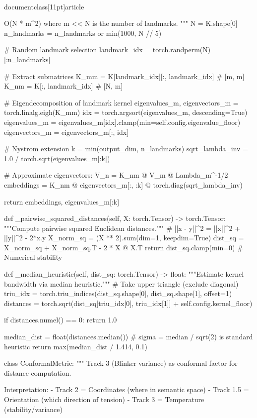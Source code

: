\\documentclass[11pt]{article}
\begin{document}
\begin{CodeBlock}
        O(N * m^2) where m << N is the number of landmarks.
        """
        N = K.shape[0]
        n_landmarks = n_landmarks or min(1000, N // 5)

        # Random landmark selection
        landmark_idx = torch.randperm(N)[:n_landmarks]

        # Extract submatrices
        K_mm = K[landmark_idx][:, landmark_idx]  # [m, m]
        K_nm = K[:, landmark_idx]                 # [N, m]

        # Eigendecomposition of landmark kernel
        eigenvalues_m, eigenvectors_m = torch.linalg.eigh(K_mm)
        idx = torch.argsort(eigenvalues_m, descending=True)
        eigenvalues_m = eigenvalues_m[idx].clamp(min=self.config.eigenvalue_floor)
        eigenvectors_m = eigenvectors_m[:, idx]

        # Nystrom extension
        k = min(output_dim, n_landmarks)
        sqrt_lambda_inv = 1.0 / torch.sqrt(eigenvalues_m[:k])

        # Approximate eigenvectors: V_n = K_nm @ V_m @ Lambda_m^{-1/2}
        embeddings = K_nm @ eigenvectors_m[:, :k] @ torch.diag(sqrt_lambda_inv)

        return embeddings, eigenvalues_m[:k]

    def _pairwise_squared_distances(self, X: torch.Tensor) -> torch.Tensor:
        """Compute pairwise squared Euclidean distances."""
        # ||x - y||^2 = ||x||^2 + ||y||^2 - 2*x.y
        X_norm_sq = (X ** 2).sum(dim=1, keepdim=True)
        dist_sq = X_norm_sq + X_norm_sq.T - 2 * X @ X.T
        return dist_sq.clamp(min=0)  # Numerical stability

    def _median_heuristic(self, dist_sq: torch.Tensor) -> float:
        """Estimate kernel bandwidth via median heuristic."""
        # Take upper triangle (exclude diagonal)
        triu_idx = torch.triu_indices(dist_sq.shape[0], dist_sq.shape[1], offset=1)
        distances = torch.sqrt(dist_sq[triu_idx[0], triu_idx[1]] + self.config.kernel_floor)

        if distances.numel() == 0:
            return 1.0

        median_dist = float(distances.median())
        # sigma = median / sqrt(2) is standard heuristic
        return max(median_dist / 1.414, 0.1)


class ConformalMetric:
    """
    Track 3 (Blinker variance) as conformal factor for distance computation.

    Interpretation:
        - Track 2 = Coordinates (where in semantic space)
        - Track 1.5 = Orientation (which direction of tension)
        - Track 3 = Temperature (stability/variance)


\end{CodeBlock}
\end{document}
